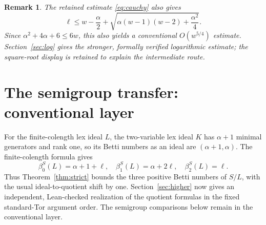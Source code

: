 \documentclass[11pt,a4paper]{article}
\newtheorem{remark}[theorem]{Remark}
\begin{document}
\begin{remark}
The retained estimate \eqref{eq:cauchy} also gives
\[
 \ell\le w-\frac\alpha2+
   \sqrt{\alpha(w-1)(w-2)+\frac{\alpha^2}{4}}.
\]
Since $\alpha^2+4\alpha+6\le6w$, this also yields a conventional $O(w^{5/4})$ estimate. Section~\ref{sec:log} gives the stronger, formally verified logarithmic estimate; the square-root display is retained to explain the intermediate route.
\end{remark}

\section{The semigroup transfer: conventional layer}
For the finite-colength lex ideal $L$, the two-variable lex ideal $K$ has $\alpha+1$ minimal generators and rank one, so its Betti numbers as an ideal are $(\alpha+1,\alpha)$. The finite-colength formula \cite[equation~(7)]{CMS} gives
\begin{equation}\label{eq:betti}
 \beta_0^S(L)=\alpha+1+\ell,\quad
 \beta_1^S(L)=\alpha+2\ell,\quad
 \beta_2^S(L)=\ell.
\end{equation}
Thus Theorem~\ref{thm:strict} bounds the three positive Betti numbers of $S/L$, with the usual ideal-to-quotient shift by one. Section~\ref{sec:higher} now gives an independent, Lean-checked realization of the quotient formulas in the fixed standard-Tor argument order. The semigroup comparisons below remain in the conventional layer.
\end{document}
